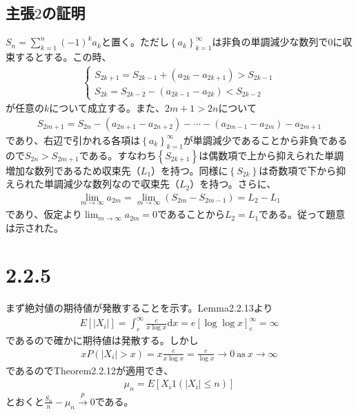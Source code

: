 \documentclass{article}
\begin{document}
\subsection{主張$2$の証明}
$S_n = \sum_{k=1}^n (-1)^k a_k$と置く。ただし$\left\{a_k\right\}_{k=1}^{\infty}$は非負の単調減少な数列で$0$に収束するとする。この時、
\begin{align*}
	\begin{cases}
	S_{2k+1} = S_{2k-1} + (a_{2k} - a_{2k+1}) > S_{2k-1}\\
	S_{2k} = S_{2k-2} - (a_{2k-1} - a_{2k}) < S_{2k-2}
	\end{cases}
\end{align*}
が任意の$k$について成立する。また、$2m+1 > 2n$について
\begin{align*}
	S_{2m+1} = S_{2n} - (a_{2n+1} - a_{2n+2}) - \cdots - (a_{2m-1} - a_{2m}) - a_{2m+1}
\end{align*}
であり、右辺で引かれる各項は$\left\{a_k\right\}_{k=1}^{\infty}$が単調減少であることから非負であるので$S_{2n} > S_{2m+1}$である。すなわち$\left\{ S_{2k+1} \right\}$は偶数項で上から抑えられた単調増加な数列であるため収束先（$L_1$）を持つ。同様に$\left\{ S_{2k} \right\}$は奇数項で下から抑えられた単調減少な数列なので収束先（$L_2$）を持つ。さらに、
\begin{align*}
	\lim_{m\to \infty} a_{2m} = \lim_{m\to \infty} (S_{2m} - S_{2m-1}) = L_2-L_1
\end{align*}
であり、仮定より$\lim_{m\to \infty} a_{2m} = 0$であることから$L_2 = L_1$である。従って題意は示された。



\section{2.2.5}
まず絶対値の期待値が発散することを示す。Lemma2.2.13より
\begin{align*}
	E\left[ |X_i| \right] = \int_e^{\infty} \frac{e}{x\log x} \mathrm{d}x = e\left[ \log \log x \right]_e^{\infty} = \infty
\end{align*}
であるので確かに期待値は発散する。しかし
\begin{align*}
	x P\left( |X_i| > x \right) = x \frac{e}{x \log x} = \frac{e}{\log x} \to 0\ \text{as}\ x\to \infty
\end{align*}
であるのでTheorem2.2.12が適用でき、
\begin{align*}
	\mu_n = E\left[ X_i 1\left(|X_i| \leq n\right) \right]
\end{align*}
とおくと$\frac{S_n}{n} - \mu_n \xrightarrow{p} 0$である。
\end{document}
